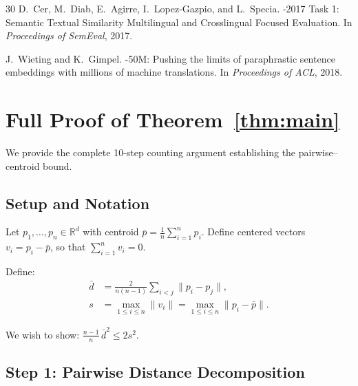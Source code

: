 \documentclass[11pt,a4paper]{article}
\newcommand{\R}{\mathbb{R}}
\begin{document}
\begin{thebibliography}{30}
D.~Cer, M.~Diab, E.~Agirre, I.~Lopez-Gazpio, and L.~Specia.
-2017 Task 1: Semantic Textual Similarity
  Multilingual and Crosslingual Focused Evaluation.
\newblock In \emph{Proceedings of SemEval}, 2017.

J.~Wieting and K.~Gimpel.
-50{M}: Pushing the limits of paraphrastic
  sentence embeddings with millions of machine translations.
\newblock In \emph{Proceedings of ACL}, 2018.

\end{thebibliography}

\clearpage
\appendix

\section{Full Proof of Theorem~\ref{thm:main}}\label{app:proof}

We provide the complete 10-step counting argument
establishing the pairwise--centroid bound.

\subsection{Setup and Notation}

Let $p_1, \ldots, p_n \in \R^d$ with centroid
$\bar{p} = \frac{1}{n}\sum_{i=1}^n p_i$.
Define centered vectors $v_i = p_i - \bar{p}$,
so that $\sum_{i=1}^n v_i = 0$.

Define:
\begin{align}
  \bar{d} &= \frac{2}{n(n-1)}\sum_{i < j}\|p_i - p_j\|, \\
  s &= \max_{1 \leq i \leq n} \|v_i\| = \max_{1 \leq i \leq n}
       \|p_i - \bar{p}\|.
\end{align}

We wish to show: $\frac{n-1}{n}\,\bar{d}^2 \leq 2s^2$.

\subsection{Step 1: Pairwise Distance Decomposition}
\end{document}
